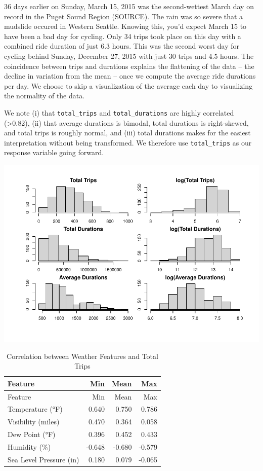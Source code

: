 \documentclass[
]{article}
\begin{document}
36 days earlier on Sunday, March 15, 2015 was the second-wettest March
day on record in the Puget Sound Region (SOURCE). The rain was so severe
that a mudslide occured in Western Seattle. Knowing this, you'd expect
March 15 to have been a bad day for cycling. Only 34 trips took place on
this day with a combined ride duration of just 6.3 hours. This was the
second worst day for cycling behind Sunday, December 27, 2015 with just
30 trips and 4.5 hours. The coincidence between trips and durations
explains the flattening of the data -- the decline in variation from the
mean -- once we compute the average ride durations per day. We choose to
skip a visualization of the average each day to visualizing the
normality of the data.

We note (i) that \texttt{total\_trips} and \texttt{total\_durations} are
highly correlated (\textgreater0.82), (ii) that average durations is
bimodal, total durations is right-skewed, and total trips is roughly
normal, and (iii) total durations makes for the easiest interpretation
without being transformed. We therefore use \texttt{total\_trips} as our
response variable going forward.

\includegraphics{MATH361_Rough_Draft_files/figure-latex/plot_normal_histograms-1.pdf}

\begin{longtable}[]{@{}lrrr@{}}
\caption{Correlation between Weather Features and Total
Trips}\tabularnewline
\toprule\noalign{}
Feature & Min & Mean & Max \\
\midrule\noalign{}
\endfirsthead
\toprule\noalign{}
Feature & Min & Mean & Max \\
\midrule\noalign{}
\endhead
\bottomrule\noalign{}
\endlastfoot
Temperature (°F) & 0.640 & 0.750 & 0.786 \\
Visibility (miles) & 0.470 & 0.364 & 0.058 \\
Dew Point (°F) & 0.396 & 0.452 & 0.433 \\
Humidity (\%) & -0.648 & -0.680 & -0.579 \\
Sea Level Pressure (in) & 0.180 & 0.079 & -0.065 \\
\end{longtable}
\end{document}
